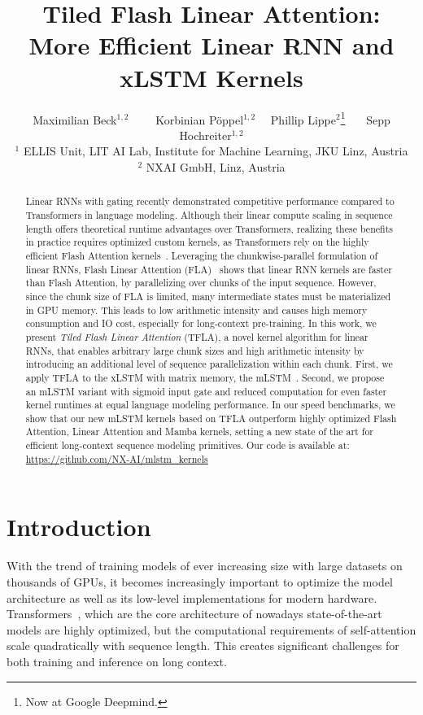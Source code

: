 \documentclass{article}
\title{Tiled Flash Linear Attention:\\More Efficient Linear RNN and xLSTM Kernels}
\author{
  Maximilian Beck$^{1,2}$ \ \ \ \
  Korbinian Pöppel$^{1,2}$ \ \
  Phillip Lippe$^{2}$\thanks{Now at Google Deepmind.} \ \ \
  Sepp Hochreiter$^{1,2}$ 
  \\
  {$^1$ }{ELLIS Unit, LIT AI Lab, Institute for Machine Learning, JKU Linz, Austria} \\
  {$^2$ }{NXAI GmbH, Linz, Austria}
}
\begin{document}
\maketitle


\begin{abstract}
    \vspace{-0.2cm}
    Linear RNNs with gating recently demonstrated competitive performance compared to Transformers in language modeling.
    Although their linear compute scaling in sequence length offers theoretical runtime advantages over Transformers, realizing these benefits in practice requires optimized custom kernels, as Transformers rely on the highly efficient Flash Attention kernels~\citep{dao:23flashattention2}.
    Leveraging the chunkwise-parallel formulation of linear RNNs, Flash Linear Attention (FLA)~\citep{yang:24fla} shows that linear RNN kernels are faster than Flash Attention, by parallelizing over chunks of the input sequence.
    However, since the chunk size of FLA is limited, many intermediate states must be materialized in GPU memory.
    This leads to low arithmetic intensity and causes high memory consumption and IO cost, especially for long-context pre-training.
    In this work, we present \emph{Tiled Flash Linear Attention} (TFLA), a novel kernel algorithm for linear RNNs, that enables arbitrary large chunk sizes and high arithmetic intensity by introducing an additional level of sequence parallelization within each chunk.
    First, we apply TFLA to the xLSTM with matrix memory, the mLSTM~\citep{beck:24xlstm}.
    Second, we propose an mLSTM variant with sigmoid input gate and reduced computation for even faster kernel runtimes at equal language modeling performance.
    In our speed benchmarks, we show that our new mLSTM kernels based on TFLA outperform highly optimized Flash Attention, Linear Attention and Mamba kernels, setting a new state of the art for efficient long-context sequence modeling primitives. %
    Our code is available at: \url{https://github.com/NX-AI/mlstm_kernels}
\end{abstract}


\section{Introduction}
\label{sec:intro}
\vspace{-0.2cm}
With the trend of training models of ever increasing size with large datasets on thousands of GPUs, it becomes increasingly important to optimize the model architecture as well as its low-level implementations for modern hardware.
Transformers~\citep{vaswani:17attention}, which are the core architecture of nowadays state-of-the-art models are highly optimized,
but the computational requirements of self-attention scale quadratically with sequence length.
This creates significant challenges for both training and inference on long context.
\end{document}
